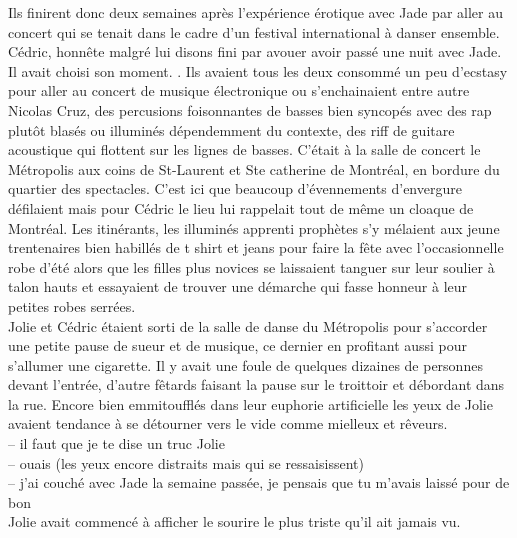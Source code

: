 \documentclass{article}
\begin{document}
Ils finirent donc deux semaines après l'expérience érotique avec Jade par aller
au concert qui se tenait dans le cadre d'un festival international à danser
ensemble. Cédric, honnête malgré lui disons fini par avouer avoir passé une nuit
avec Jade. Il avait choisi son moment. . Ils avaient tous les deux consommé un
peu d'ecstasy pour aller au concert de musique électronique ou s'enchainaient
entre autre Nicolas Cruz, des percusions foisonnantes de basses bien syncopés
avec des rap plutôt blasés ou illuminés dépendemment du contexte, des riff de
guitare acoustique qui flottent sur les lignes de basses. C'était à la salle de
concert le Métropolis aux coins de St-Laurent et Ste catherine de Montréal, en
bordure du quartier des spectacles. C'est ici que beaucoup d'évennements
d'envergure défilaient mais pour Cédric le lieu lui rappelait tout de même un
cloaque de Montréal. Les itinérants, les illuminés apprenti prophètes s'y
mélaient aux jeune trentenaires bien habillés de t shirt et jeans pour faire la
fête avec l'occasionnelle robe d'été alors que les filles plus novices se
laissaient tanguer sur leur soulier à talon hauts et essayaient de trouver une
démarche qui fasse honneur à leur petites robes serrées.\\

Jolie et Cédric étaient sorti de la salle de danse du Métropolis pour s'accorder
une petite pause de sueur et de musique, ce dernier en profitant aussi pour
s'allumer une cigarette. Il y avait une foule de quelques dizaines de personnes
devant l'entrée, d'autre fêtards faisant la pause sur le troittoir et débordant
dans la rue. Encore bien emmitoufflés dans leur euphorie artificielle les yeux
de Jolie avaient tendance à se détourner vers le vide comme mielleux et rêveurs.\\

-- il faut que je te dise un truc Jolie\\
-- ouais (les yeux encore distraits mais qui se ressaisissent)\\
-- j'ai couché avec Jade la semaine passée, je pensais que tu m'avais laissé pour de bon\\

Jolie avait commencé à afficher le sourire le plus triste qu'il ait jamais vu.

\clearpage
\end{document}
